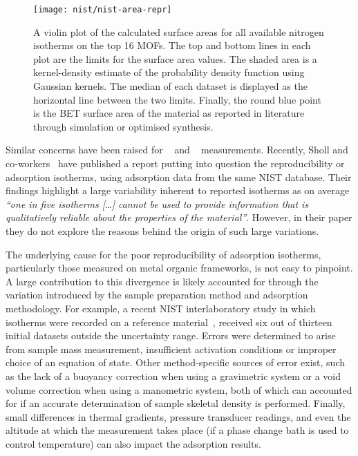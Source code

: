 \begin{figure}[tb]
	\centering
	\texttt{[image: nist/nist-area-repr]}%
	\caption{A violin plot of the calculated surface areas for
		all available nitrogen isotherms on the top 16 \glspl{MOF}.
		The top and bottom lines in each plot are the limits for
		the surface area values. The shaded area is a kernel-density estimate
		of the probability density function using Gaussian kernels.
		The median of each dataset is displayed as the horizontal line
		between the two limits. Finally, the round blue point is the
		\gls{BET} surface area of the material as reported in literature
		through simulation or optimised synthesis.
	}\label{pyg:fig:nist-area-repr}
\end{figure}

Similar concerns have been
raised for ~\cite{broomIrreproducibilityHydrogenStorage2016}
and ~\cite{espinalMeasurementStandardsData2013} measurements.
Recently, Sholl and co-workers~\cite{parkHowReproducibleAre2017}
have published a report putting into question the reproducibility
or adsorption isotherms, using  adsorption data from the
same \gls{NIST} database. Their findings highlight a large
variability inherent
to reported isotherms as on average \textit{``one in five 
	isotherms [\ldots] cannot be used to provide information that
	is qualitatively reliable about the properties of the material''}.
However, in their paper they do not explore the reasons behind the
origin of such large variations.

The underlying cause for the poor reproducibility of adsorption
isotherms, particularly those measured on metal organic frameworks,
is not easy to pinpoint. A large contribution to this divergence
is likely accounted for through the variation introduced by the
sample preparation method and adsorption methodology.
For example, a recent \gls{NIST} interlaboratory study in which 
isotherms were recorded on a reference
material~\cite{nguyenReferenceHighpressureCO22018}, received six
out of thirteen initial datasets outside the uncertainty range.
Errors were determined to arise from sample mass measurement,
insufficient activation conditions or improper choice of an
equation of state. Other method-specific sources of error exist,
such as the lack of a buoyancy correction when using a
gravimetric system or a void volume correction when using
a manometric system, both of which can accounted for if an accurate
determination of sample skeletal density is performed. Finally,
small differences in thermal gradients, pressure transducer
readings, and even the altitude at which the measurement takes place
(if a phase change bath is used to control temperature)
can also impact the adsorption results.

